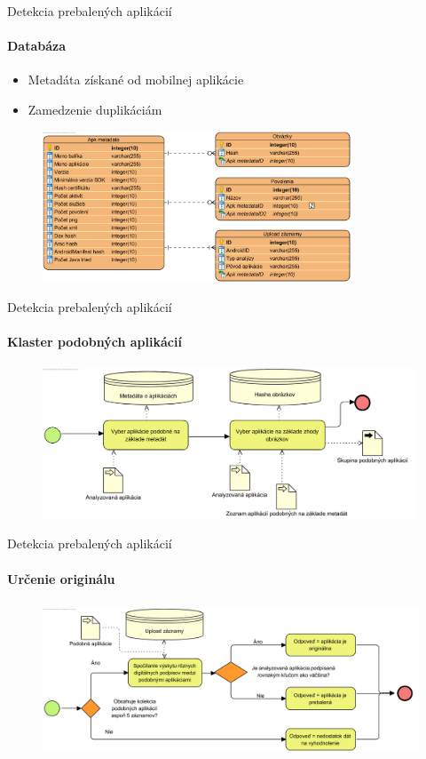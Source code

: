 \documentclass{beamer}
\begin{document}
  \begin{frame}[label=lists]{Detekcia prebalených aplikácií}
 	 \framesubtitle{Databáza}
		\begin{itemize}
			\item Metadáta získané od mobilnej aplikácie
			\item Zamedzenie duplikáciám
		\end{itemize}
		\begin{figure}[htb]
	  	\begin{center}
    		\includegraphics[height=4.5cm]{images/detection-db-erd.png}
  		\end{center}
	\end{figure}
  \end{frame}   
  
  \begin{frame}[label=lists]{Detekcia prebalených aplikácií}
 	 \framesubtitle{Klaster podobných aplikácií}
		\begin{figure}[htb]
	  	\begin{center}
    		\includegraphics[height=4.5cm]{images/detection-cluster.png}
  		\end{center}
	\end{figure}
  \end{frame}   
  
  \begin{frame}[label=lists]{Detekcia prebalených aplikácií}
 	 \framesubtitle{Určenie originálu}
		\begin{figure}[htb]
	  	\begin{center}
    		\includegraphics[height=4.5cm]{images/detection-original.png}
  		\end{center}
	\end{figure}
  \end{frame}    
  
\end{document}
